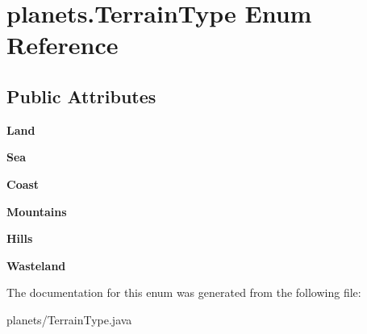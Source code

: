 \hypertarget{enumplanets_1_1_terrain_type}{}\section{planets.\+Terrain\+Type Enum Reference}
\label{enumplanets_1_1_terrain_type}
\subsection*{Public Attributes}
\begin{DoxyCompactItemize}
\item 
{\bfseries Land}\hypertarget{enumplanets_1_1_terrain_type_a38ce91482445770fde306defa83676eb}{}\label{enumplanets_1_1_terrain_type_a38ce91482445770fde306defa83676eb}

\item 
{\bfseries Sea}\hypertarget{enumplanets_1_1_terrain_type_a30b83f0939e0b66d4b0b2d3940167b03}{}\label{enumplanets_1_1_terrain_type_a30b83f0939e0b66d4b0b2d3940167b03}

\item 
{\bfseries Coast}\hypertarget{enumplanets_1_1_terrain_type_aa1b0a5ae1eda9e0421e405f5a390dcad}{}\label{enumplanets_1_1_terrain_type_aa1b0a5ae1eda9e0421e405f5a390dcad}

\item 
{\bfseries Mountains}\hypertarget{enumplanets_1_1_terrain_type_a6ceab7fa599cc4dffc300f79d0f2de49}{}\label{enumplanets_1_1_terrain_type_a6ceab7fa599cc4dffc300f79d0f2de49}

\item 
{\bfseries Hills}\hypertarget{enumplanets_1_1_terrain_type_a739d2ca4f8c6a4738a1905bb4d6b4da7}{}\label{enumplanets_1_1_terrain_type_a739d2ca4f8c6a4738a1905bb4d6b4da7}

\item 
{\bfseries Wasteland}\hypertarget{enumplanets_1_1_terrain_type_a7c713a5704d3d5860ddded6d54a4a70f}{}\label{enumplanets_1_1_terrain_type_a7c713a5704d3d5860ddded6d54a4a70f}

\end{DoxyCompactItemize}


The documentation for this enum was generated from the following file\+:\begin{DoxyCompactItemize}
\item 
planets/Terrain\+Type.\+java\end{DoxyCompactItemize}
